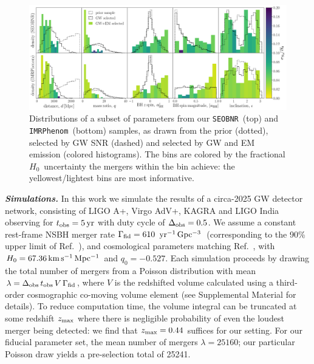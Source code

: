 \documentclass[%
 reprint,
 superscriptaddress,
 nofootinbib,
 amsmath,amssymb,
 aps,
]{revtex4-2}
\newcommand{\hubble}{\ensuremath{H_0}}
\newcommand{\decel}{\ensuremath{q_0}}
\newcommand{\zmax}{\ensuremath{z_{\rm max}}}
\newcommand{\tobs}{t_{\rm obs}}
\newcommand{\fobs}{\Delta_{\rm obs}}
\newcommand{\kmsmpc}{\ensuremath{{\rm km\,s^{-1}\,Mpc^{-1}}}}
\newcommand{\yr}{\ensuremath{{\rm yr}}}
\newcommand{\yrgpc}{\ensuremath{{\rm yr^{-1}\,Gpc^{-3}}}}
\newcommand{\seobnr}{\texttt{SEOBNR}}
\newcommand{\imrp}{\texttt{IMRPhenom}}
\begin{document}
\begin{figure}[ht!]
\includegraphics[width=18cm]{fig_1.pdf}
\caption{Distributions of a subset of parameters from our \seobnr\ (top) and \imrp\ (bottom) samples, as drawn from the prior (dotted), selected by GW SNR (dashed) and selected by GW and EM emission (colored histograms). The bins are colored by the fractional \hubble\ uncertainty the mergers within the bin achieve: the yellowest/lightest bins are most informative. \label{fig:pops}}
\end{figure}

\textbf{\emph{Simulations.}} In this work we simulate the results of a circa-2025 GW detector network, consisting of LIGO A+, Virgo AdV+, KAGRA and LIGO India~\cite{Abbott_etal:2013,LVCnoise} observing for $\tobs = 5\,\yr$ with duty cycle of $\fobs=0.5$. We assume a constant rest-frame  NSBH merger rate $\Gamma_{\rm fid} = 610$ \yrgpc\ (corresponding to the 90\% upper limit of Ref.~\cite{Ligo:2018}), and cosmological parameters matching Ref.~\cite{Planck_VI:2018}, with $\hubble=67.36\,\kmsmpc$ and $\decel=-0.527$. Each simulation proceeds by drawing the total number of mergers from a Poisson distribution with mean $\lambda = \fobs \, \tobs \, V \, \Gamma_{\rm fid} $, where $V$ is the redshifted volume calculated using a third-order cosmographic co-moving volume element (see Supplemental Material for details). To reduce computation time, the volume integral can be truncated at some redshift $\zmax$ where there is negligible probability of even the loudest merger being detected: we find that $\zmax=0.44$ suffices for our setting. For our fiducial parameter set, the mean number of mergers $\lambda = 25160$; our particular Poisson draw yields a pre-selection total of 25241.
\end{document}
